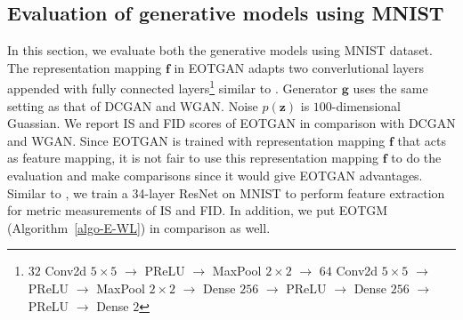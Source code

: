 \subsection{Evaluation of generative models using MNIST}
In this section, we evaluate both the generative models using MNIST dataset.
The representation mapping $\bm{f}$ in EOTGAN adapts two converlutional layers
appended with fully connected layers\footnote{$32$ Conv2d $5 \times5$
  $\rightarrow$ PReLU $\rightarrow$ MaxPool $2\times2$ $\rightarrow$
  $64$ Conv2d $5\times5$ $\rightarrow$ PReLU $\rightarrow$ MaxPool
  $2\times2$ $\rightarrow$ Dense $256$ $\rightarrow$ PReLU
  $\rightarrow$ Dense $256$ $\rightarrow$ PReLU $\rightarrow$ Dense
  $2$}
similar to \cite{1467314}\cite{1640964}. Generator $\bm{g}$ uses the same
setting as that of DCGAN and WGAN. Noise $p(\bm{z})$ is $100$-dimensional Guassian.
We report IS and FID scores of EOTGAN in comparison with DCGAN and WGAN. Since EOTGAN is trained with representation mapping $\bm{f}$ that
acts as feature mapping, it is not fair to use this representation mapping $\bm{f}$ to do the
evaluation and make comparisons since it would give EOTGAN
advantages. Similar to \cite{2018arXiv180607755X}, we train a 34-layer
ResNet on MNIST to perform feature extraction for metric measurements
of IS and FID. In addition, we put EOTGM (Algorithm~\autoref{algo-E-WL}) in comparison as well.


